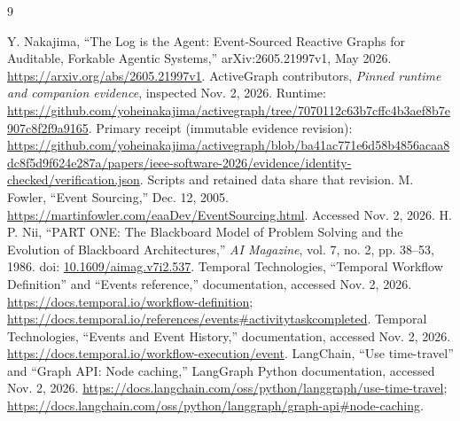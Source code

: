 \documentclass[11pt]{article}
\begin{document}
\begin{thebibliography}{9}
\small\raggedright\setlength{\baselineskip}{11pt}
\setlength{\itemsep}{0pt}
\setlength{\parskip}{0pt}
\setlength{\parsep}{0pt}
 Y. Nakajima, ``The Log is the Agent: Event-Sourced Reactive Graphs for Auditable, Forkable Agentic Systems,'' arXiv:2605.21997v1, May 2026. \url{https://arxiv.org/abs/2605.21997v1}.
 ActiveGraph contributors, \emph{Pinned runtime and companion evidence}, inspected Nov. 2, 2026. Runtime: \url{https://github.com/yoheinakajima/activegraph/tree/7070112c63b7cffc4b3aef8b7e907c8f2f9a9165}. Primary receipt (immutable evidence revision): \url{https://github.com/yoheinakajima/activegraph/blob/ba41ac771e6d58b4856acaa8dc8f5d9f624e287a/papers/ieee-software-2026/evidence/identity-checked/verification.json}. Scripts and retained data share that revision.
 M. Fowler, ``Event Sourcing,'' Dec. 12, 2005. \url{https://martinfowler.com/eaaDev/EventSourcing.html}. Accessed Nov. 2, 2026.
 H. P. Nii, ``PART ONE: The Blackboard Model of Problem Solving and the Evolution of Blackboard Architectures,'' \emph{AI Magazine}, vol. 7, no. 2, pp. 38--53, 1986. doi: \href{https://doi.org/10.1609/aimag.v7i2.537}{10.1609/aimag.v7i2.537}.
 Temporal Technologies, ``Temporal Workflow Definition'' and ``Events reference,'' documentation, accessed Nov. 2, 2026. \url{https://docs.temporal.io/workflow-definition}; \url{https://docs.temporal.io/references/events#activitytaskcompleted}.
 Temporal Technologies, ``Events and Event History,'' documentation, accessed Nov. 2, 2026. \url{https://docs.temporal.io/workflow-execution/event}.
 LangChain, ``Use time-travel'' and ``Graph API: Node caching,'' LangGraph Python documentation, accessed Nov. 2, 2026. \url{https://docs.langchain.com/oss/python/langgraph/use-time-travel}; \url{https://docs.langchain.com/oss/python/langgraph/graph-api#node-caching}.
\end{thebibliography}
\end{document}
